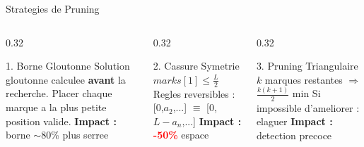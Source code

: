 \documentclass[aspectratio=169,9pt]{beamer}
\begin{document}
\begin{frame}[shrink=5]{Strategies de Pruning}
    \begin{columns}[T]
        \begin{column}{0.32\textwidth}
            \begin{block}{1. Borne Gloutonne}
                \small
                Solution gloutonne calculee \textbf{avant} la recherche.
                \vspace{0.1cm}
                {\footnotesize Placer chaque marque a la plus petite position valide.}
                \vspace{0.1cm}
                \textbf{Impact :} borne $\sim$80\% plus serree
            \end{block}
        \end{column}
        \begin{column}{0.32\textwidth}
            \begin{block}{2. Cassure Symetrie}
                \small
                $marks[1] \leq \frac{L}{2}$
                \vspace{0.1cm}
                {\footnotesize Regles reversibles : [0,$a_2$,...] $\equiv$ [0,$L-a_n$,...]}
                \vspace{0.1cm}
                \textbf{Impact :} \textcolor{red}{\textbf{-50\%}} espace
            \end{block}
        \end{column}
        \begin{column}{0.32\textwidth}
            \begin{block}{3. Pruning Triangulaire}
                \small
                $k$ marques restantes $\Rightarrow$ $\frac{k(k+1)}{2}$ min
                \vspace{0.1cm}
                {\footnotesize Si impossible d'ameliorer : elaguer}
                \vspace{0.1cm}
                \textbf{Impact :} detection precoce
            \end{block}
        \end{column}
    \end{columns}
    \vspace{0.2cm}
    \centering
\end{frame}
\end{document}
